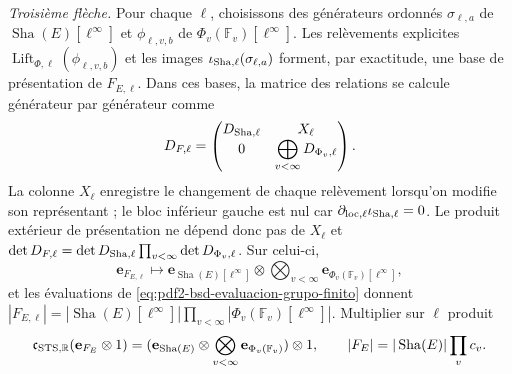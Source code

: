 \begin{proposition}
\emph{Troisième flèche.} Pour chaque $\ell$, choisissons des générateurs ordonnés
$\sigma_{\ell,a}$ de $\operatorname{Sha}(E)[\ell^\infty]$ et
$\phi_{\ell,v,b}$ de $\Phi_v(\mathbb F_v)[\ell^\infty]$. Les relèvements explicites
$\operatorname{Lift}_{\Phi,\ell}(\phi_{\ell,v,b})$ et les images
$\iota_{{\rm Sha},\ell}(\sigma_{\ell,a})$ forment, par exactitude, une base de
présentation de $F_{E,\ell}$. Dans ces bases, la matrice des relations se
calcule générateur par générateur comme
\begin{equation}\label{eq:pdf2-bsd-c3-matriz-presentacion}
 D_{F,\ell}=
 \begin{pmatrix}
  D_{{\rm Sha},\ell}&X_\ell\\
  0&\displaystyle\bigoplus_{v<\infty}D_{\Phi_v,\ell}
 \end{pmatrix}.
\end{equation}
La colonne $X_\ell$ enregistre le changement de chaque relèvement lorsqu'on modifie son
représentant ; le bloc inférieur gauche est nul car
$\partial_{{\rm loc},\ell}\iota_{{\rm Sha},\ell}=0$. Le produit extérieur de
présentation ne dépend donc pas de $X_\ell$ et
$\det D_{F,\ell}=\det D_{{\rm Sha},\ell}
\prod_{v<\infty}\det D_{\Phi_v,\ell}$. Sur celui-ci,
\begin{equation}\label{eq:pdf2-bsd-c3-generadores}
 \mathbf e_{F_{E,\ell}}
 \longmapsto
 \mathbf e_{\operatorname{Sha}(E)[\ell^\infty]}
 \otimes\bigotimes_{v<\infty}
    \mathbf e_{\Phi_v(\mathbb F_v)[\ell^\infty]},
\end{equation}
et les évaluations de \eqref{eq:pdf2-bsd-evaluacion-grupo-finito} donnent
$|F_{E,\ell}|=|\operatorname{Sha}(E)[\ell^\infty]|
\prod_{v<\infty}|\Phi_v(\mathbb F_v)[\ell^\infty]|$.
Multiplier sur $\ell$ produit
\begin{equation}\label{eq:pdf2-bsd-c3-integral-generadores}
 \mathfrak c_{{\rm STS},\mathbb R}(\mathbf e_{F_E}\otimes1)
 =(\mathbf e_{\operatorname{Sha}(E)}
  \otimes\bigotimes_{v<\infty}\mathbf e_{\Phi_v(\mathbb F_v)})\otimes1,
 \qquad
 |F_E|=|\operatorname{Sha}(E)|\prod_vc_v.
\end{equation}


\end{proposition}
